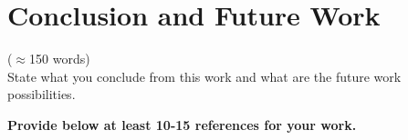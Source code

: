 \documentclass[12pt]{article}
\begin{document}
\section{Conclusion and Future Work}\label{chap:conclusion}
($\approx$150 words)\\
State what you conclude from this work and what are the future work possibilities.


\textbf{Provide below at least 10-15 references for your work.}



\pagebreak
\end{document}

